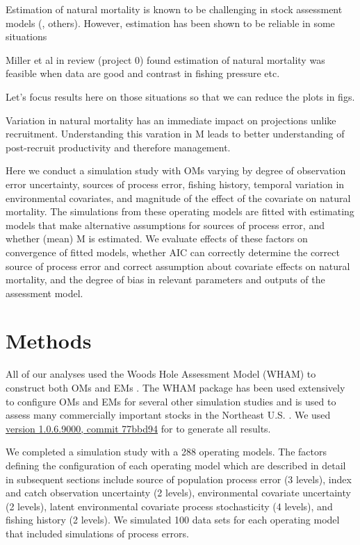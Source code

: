 \documentclass[
  12pt,
]{article}
\begin{document}
Estimation of natural mortality is known to be challenging in stock assessment models (\citet{leeetal11}, others). However, estimation has been shown to be reliable in some situations \citep{millerhyun18}

Miller et al in review (project 0) found estimation of natural mortality was feasible when data are good and contrast in fishing pressure etc.

Let's focus results here on those situations so that we can reduce the plots in figs.

Variation in natural mortality has an immediate impact on projections unlike recruitment. Understanding this varation in M leads to better understanding of post-recruit productivity and therefore management.

Here we conduct a simulation study with OMs varying by degree of observation error uncertainty, sources of process error, fishing history, temporal variation in environmental covariates, and magnitude of the effect of the covariate on natural mortality. The simulations from these operating models are fitted with estimating models that make alternative assumptions for sources of process error, and whether (mean) M is estimated. We evaluate effects of these factors on convergence of fitted models, whether AIC can correctly determine the correct source of process error and correct assumption about covariate effects on natural mortality, and the degree of bias in relevant parameters and outputs of the assessment model.

\hypertarget{methods}{%
\section*{Methods}\label{methods}}

All of our analyses used the Woods Hole Assessment Model (WHAM) to construct both OMs and EMs \citep{millerstock20, stockmiller21, milleretal_inreview}. The WHAM package has been used extensively to configure OMs and EMs for several other simulation studies \citep{stocketal21, legaultetal23, lietal24, brittenetal_inreview, lietal_inreview_a} and is used to assess many commercially important stocks in the Northeast U.S. \citep[e.g.,][]{nefsc22, nefsc22a, nefsc24}. We used \href{https://github.com/timjmiller/wham/tree/77bbd946e4881216a439933473d1c58b21c270c3}{version 1.0.6.9000, commit 77bbd94} for to generate all results.

We completed a simulation study with a 288 operating models. The factors defining the configuration of each operating model which are described in detail in subsequent sections include source of population process error (3 levels), index and catch observation uncertainty (2 levels), environmental covariate uncertainty (2 levels), latent environmental covariate process stochasticity (4 levels), and fishing history (2 levels). We simulated 100 data sets for each operating model that included simulations of process errors.
\end{document}
